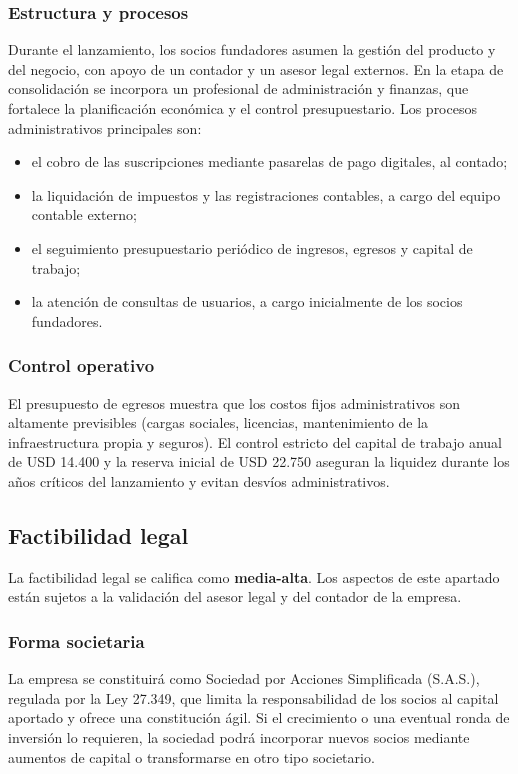 \subsubsection{Estructura y procesos}
Durante el lanzamiento, los socios fundadores asumen la gestión del producto y del negocio, con apoyo de un contador y un asesor legal externos. En la etapa de consolidación se incorpora un profesional de administración y finanzas, que fortalece la planificación económica y el control presupuestario. Los procesos administrativos principales son:
\begin{itemize}
  \item el cobro de las suscripciones mediante pasarelas de pago digitales, al contado;
  \item la liquidación de impuestos y las registraciones contables, a cargo del equipo contable externo;
  \item el seguimiento presupuestario periódico de ingresos, egresos y capital de trabajo;
  \item la atención de consultas de usuarios, a cargo inicialmente de los socios fundadores.
\end{itemize}

\subsubsection{Control operativo}
El presupuesto de egresos muestra que los costos fijos administrativos son altamente previsibles (cargas sociales, licencias, mantenimiento de la infraestructura propia y seguros). El control estricto del capital de trabajo anual de USD 14.400 y la reserva inicial de USD 22.750 aseguran la liquidez durante los años críticos del lanzamiento y evitan desvíos administrativos.

\subsection{Factibilidad legal}
La factibilidad legal se califica como \textbf{media-alta}. Los aspectos de este apartado están sujetos a la validación del asesor legal y del contador de la empresa.

\subsubsection{Forma societaria}
La empresa se constituirá como Sociedad por Acciones Simplificada (S.A.S.), regulada por la Ley 27.349, que limita la responsabilidad de los socios al capital aportado y ofrece una constitución ágil. Si el crecimiento o una eventual ronda de inversión lo requieren, la sociedad podrá incorporar nuevos socios mediante aumentos de capital o transformarse en otro tipo societario.

